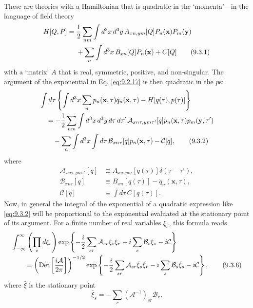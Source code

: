These are theories with a Hamiltonian that is quadratic in the `momenta'---in
the language of field theory
\begin{align}
H[Q,P]={}&\frac12\sum_{nm}\int d^3x\,d^3y\,
 A_{xn,ym}[Q]P_n(\mathbf{x})P_m(\mathbf{y})
\notag\\
&+\sum_n\int d^3x\,B_{xn}[Q]P_n(\mathbf{x})+C[Q]
\tag{9.3.1}\label{eq:9.3.1}
\end{align}
with a `matrix' $A$ that is real, symmetric, positive, and non-singular. The
argument of the exponential in Eq. \eqref{eq:9.2.17} is then quadratic in the $p$s:
\begin{align}
&\int d\tau\left\{\int d^3x\sum_n p_n(\mathbf{x},\tau)
 \dot q_n(\mathbf{x},\tau)-H[q(\tau),p(\tau)]\right\}
\notag\\
&\quad=-\frac12\sum_{nm}\int d^3x\,d^3y\,d\tau\,d\tau'\,
 \mathcal A_{xn\tau,ym\tau'}[q]p_n(\mathbf{x},\tau)p_m(\mathbf{y},\tau')
\notag\\
&\qquad-\sum_n\int d^3x\int d\tau\,
 \mathcal B_{xn\tau}[q]p_n(\mathbf{x},\tau)-\mathcal C[q],
\tag{9.3.2}\label{eq:9.3.2}
\end{align}
where
\begin{align}
\mathcal A_{xn\tau,ym\tau'}[q]
&\equiv A_{xn,ym}[q(\tau)]\delta(\tau-\tau'),
\tag{9.3.3}\label{eq:9.3.3}\\
\mathcal B_{xn\tau}[q]
&\equiv B_{xn}[q(\tau)]-\dot q_n(\mathbf{x},\tau),
\tag{9.3.4}\label{eq:9.3.4}\\
\mathcal C[q]&\equiv\int d\tau\,C[q(\tau)].
\tag{9.3.5}\label{eq:9.3.5}
\end{align}
Now, in general the integral of the exponential of a quadratic expression
like \eqref{eq:9.3.2} will be proportional to the exponential evaluated at the
stationary point of its argument. For a finite number of real variables
$\xi_s$, this formula reads
\begin{align}
&\int_{-\infty}^{\infty}\left(\prod_s d\xi_s\right)
 \exp\left\{-\frac{i}{2}\sum_{sr}\mathcal A_{sr}\xi_s\xi_r
 -i\sum_s\mathcal B_s\xi_s-i\mathcal C\right\}
\notag\\
&\qquad=
 \left(\operatorname{Det}\left[\frac{i\mathcal A}{2\pi}\right]\right)^{-1/2}
 \exp\left\{-\frac{i}{2}\sum_{sr}\mathcal A_{sr}\bar\xi_s\bar\xi_r
 -i\sum_s\mathcal B_s\bar\xi_s-i\mathcal C\right\},
\tag{9.3.6}\label{eq:9.3.6}
\end{align}
where $\bar\xi$ is the stationary point
\begin{equation}
\bar\xi_s=-\sum_r(\mathcal A^{-1})_{sr}\mathcal B_r.
\tag{9.3.7}\label{eq:9.3.7}
\end{equation}
